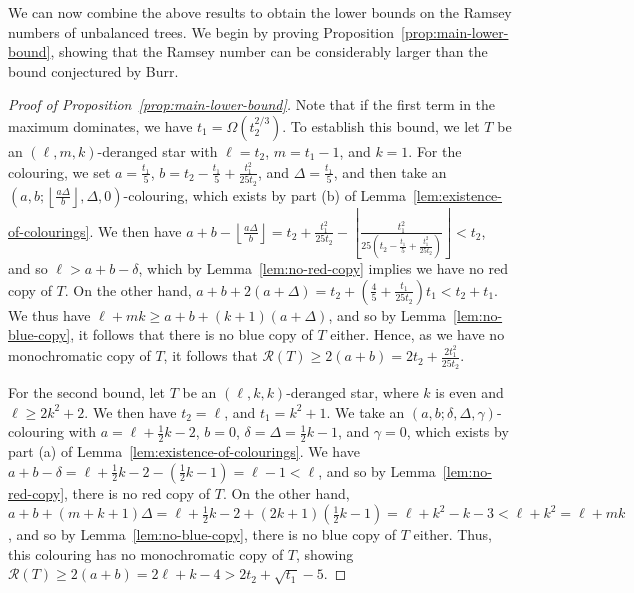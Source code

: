 \documentclass[11pt]{article}
\begin{document}
We can now combine the above results to obtain the lower bounds on the Ramsey numbers of unbalanced trees. We begin by proving Proposition~\ref{prop:main-lower-bound}, showing that the Ramsey number can be considerably larger than the bound conjectured by Burr.

\begin{proof}[Proof of Proposition~\ref{prop:main-lower-bound}]
    Note that if the first term in the maximum dominates, we have $t_1 = \Omega(t_2^{2/3})$. To establish this bound, we let $T$ be an $(\ell, m, k)$-deranged star with $\ell = t_2$, $m = t_1 - 1$, and $k=1$. For the colouring, we set $a = \frac{t_1}{5}$, $b = t_2 - \frac{t_1}{5} + \frac{t_1^2}{25 t_2}$, and $\Delta = \frac{t_1}{5}$, and then take an $(a,b; \left \lfloor \frac{a\Delta}{b} \right\rfloor, \Delta, 0)$-colouring, which  exists by part (b) of Lemma~\ref{lem:existence-of-colourings}. We then have $a + b - \left \lfloor \frac{a\Delta}{b} \right\rfloor = t_2 + \frac{t_1^2}{25t_2} - \left \lfloor \frac{t_1^2}{25 \left(t_2 - \frac{t_1}{5} + \frac{t_1^2}{25t_2} \right)} \right\rfloor < t_2$, and so $\ell > a + b - \delta$, which by Lemma~\ref{lem:no-red-copy} implies we have no red copy of $T$. On the other hand, $a + b + 2(a + \Delta) = t_2 + \left( \frac45 + \frac{t_1}{25 t_2} \right) t_1 < t_2 + t_1$. We thus have $\ell + mk \ge a + b + (k+1)(a + \Delta)$, and so by Lemma~\ref{lem:no-blue-copy}, it follows that there is no blue copy of $T$ either. Hence, as we have no monochromatic copy of $T$, it follows that $\mathcal{R}(T) \ge 2(a+b) = 2t_2 + \frac{2 t_1^2}{25 t_2} $.

    For the second bound, let $T$ be an $(\ell, k, k)$-deranged star, where $k$ is even and $\ell \ge 2k^2 + 2$. We then have $t_2 = \ell$, and $t_1 = k^2 + 1$. We take an $(a,b; \delta, \Delta, \gamma)$-colouring with $a = \ell + \frac12 k - 2$, $b = 0$, $\delta = \Delta = \frac12 k - 1$, and $\gamma = 0$, which exists by part (a) of Lemma~\ref{lem:existence-of-colourings}. We have $a + b - \delta = \ell + \frac12 k - 2 - ( \frac12 k - 1) = \ell - 1 < \ell$, and so by Lemma~\ref{lem:no-red-copy}, there is no red copy of $T$. On the other hand, $a + b + (m + k + 1)\Delta = \ell + \frac12 k - 2 + (2k + 1) (\frac12 k - 1) = \ell + k^2 - k - 3 < \ell + k^2 = \ell + mk$, and so by Lemma~\ref{lem:no-blue-copy}, there is no blue copy of $T$ either. Thus, this colouring has no monochromatic copy of $T$, showing $\mathcal{R}(T) \ge 2(a + b) = 2 \ell + k - 4 > 2 t_2 + \sqrt{t_1} - 5$.
\end{proof}
\end{document}
